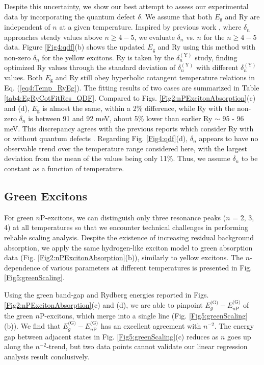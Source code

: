 \documentclass[aps,reprint,amsmath,amssymb,prb]{revtex4-1}
\begin{document}
Despite this uncertainty, we show our best attempt to assess our experimental data by incorporating the quantum defect $\delta$. We assume that both $E_\text{g}$ and Ry are independent of $n$ at a given temperature. Inspired by previous work \cite{Schone2016QD}, where $\delta_n$ approaches steady values above $n\geq 4-5$, we evaluate $\delta_n$ vs. $n$  for the  $n\geq 4-5$ data. Figure \ref{Fig4:qdf}(b) shows the updated $E_\text{g}$ and Ry using this method with non-zero $\delta_n$ for the yellow excitons. Ry is taken by the $\delta_n^{(\text{Y})}$ study, finding optimized Ry values through  the standard deviation of $\delta_n^{(\text{Y})}$ with different $\delta_n^{(\text{Y})}$ values. Both $E_\text{g}$ and Ry still obey hyperbolic cotangent temperature relations in Eq. (\ref{eq4:Temp_RyEg}). The fitting results of two cases are summarized in Table \ref{tab4:EgRyCotFitRes_QDF}. Compared to Figs. \ref{Fig2:nPExcitonAbsorption}(c) and (d), $E_\text{g}$ is almost the same, within a 2\% difference, while Ry with the non-zero $\delta_n$ is between 91 and 92 meV, about 5\% lower than earlier Ry $\sim$ 95 - 96 meV. This discrepancy agrees with the previous reports which consider Ry with or without quantum defects \cite{Gross1956, Schone2016, Heckotter2017}. Regarding Fig. {\ref{Fig4:qdf}(d)}, $\delta_n$ appears to have no observable trend over the temperature range considered here, with the largest deviation from the mean of the values being only 11\%. Thus, we assume $\delta_n$ to be constant as a function of temperature.

\subsection {Green Excitons}

For green $n$P-excitons, we can distinguish only three resonance peaks ($n$ = 2, 3, 4) at all temperatures so that we encounter technical challenges in performing reliable scaling analysis. Despite the existence of increasing residual background absorption, we apply the same hydrogen-like exciton model to green absorption data (Fig. \ref{Fig2:nPExcitonAbsorption}(b)), similarly to yellow excitons. The $n$-dependence of various parameters at different temperatures is presented in Fig. \ref{Fig5:greenScaling}. 

Using the green band-gap and Rydberg energies reported in Figs. \ref{Fig2:nPExcitonAbsorption}(c) and (d),  we are able to pinpoint  $E_g^{\text{(G)}} - E_{n\text{P}}^{\text{(G)}}$ of the green $n$P-excitons, which merge into a single line (Fig. \ref{Fig5:greenScaling}(b)). We find that $E_g^{\text{(G)}} - E_{n\text{P}}^{\text{(G)}}$ has an excellent agreement with $n^{-2}$.
The energy gap between adjacent states in Fig. \ref{Fig5:greenScaling}(c) reduces as $n$ goes up along the $n^{-2}$-trend, but two data points cannot validate our linear regression analysis result conclusively. 
\end{document}
